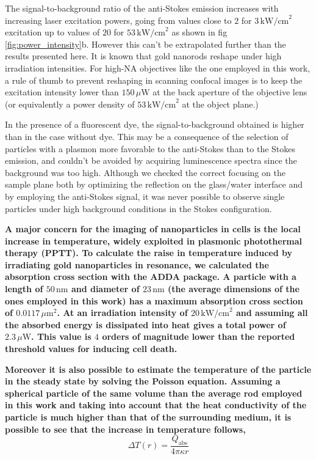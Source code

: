 \documentclass[journal=nalefd,manuscript=letter]{achemso}
\newcommand{\nm}{\ensuremath{\,\textrm{nm}}}
\newcommand{\um}{\ensuremath{\,\mu\textrm{m}}}
\newcommand{\uW}{\ensuremath{\,\mu\textrm{W}}}
\newcommand{\pwr}{\ensuremath{\,\textrm{kW/cm}^2}}
\begin{document}
The signal-to-background ratio of the anti-Stokes emission increases with
increasing laser excitation powers, going from values close to $2$ for $3\pwr$
excitation up to values of $20$ for $53\pwr$ as shown in fig
\ref{fig:power_intensity}b. However this can't be extrapolated further than the
results presented here. It is known that gold nanorods reshape under high
irradiation intensities\cite{Liu2009}. For high-NA objectives like the one
employed in this work, a rule of thumb to prevent reshaping in scanning confocal images is to
keep the excitation intensity lower than $150\uW$ at the back aperture of the
objective lens (or equivalently a power density of $53\pwr$ at the object
plane.)

In the presence of a fluorescent dye, the signal-to-background obtained is
higher than in the case without dye. This may be a consequence of the selection
of particles with a plasmon more favorable to the anti-Stokes than to the Stokes
emission, and couldn't be avoided by acquiring luminescence spectra since the
background was too high. Although we checked the correct focusing on the sample
plane both by optimizing the reflection on the glass/water interface and by
employing the anti-Stokes signal, it was never possible to observe single
particles under high background conditions in the Stokes configuration.

\textbf{A major concern for the imaging of nanoparticles in cells is the local
increase in temperature, widely exploited in plasmonic photothermal therapy
(PPTT)\cite{Huang2008}. To calculate the raise in temperature induced by
irradiating gold nanoparticles in resonance, we calculated the absorption cross
section with the ADDA package\cite{Yurkin2011}. A particle with a length of
$50\nm$ and diameter of $23\nm$ (the average dimensions of the ones employed in
this work) has a maximum absorption cross section of $0.0117\um^2$. At an
irradiation intensity of $20\pwr$ and assuming all the absorbed energy is
dissipated into heat gives a total power of $2.3\uW$. This value is $4$ orders
of magnitude lower than the reported threshold values for inducing cell
death\cite{Huang2006a}.}

\textbf{Moreover it is also possible to estimate the temperature of the particle
in the steady state by solving the Poisson equation. Assuming a spherical particle of
the same volume than the average rod employed in this work and taking into
account that the heat conductivity of the particle is much higher than that of the
surrounding medium, it is possible to see that the increase in temperature
follows,}
\begin{equation*}
	\Delta T(r) = \frac{Q_\textrm{abs}}{4\pi\kappa r}
\end{equation*}
\end{document}
